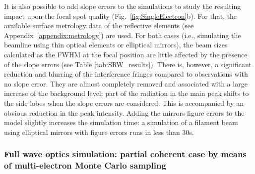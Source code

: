 \documentclass{iucr}              %
\begin{document}
It is also possible to add slope errors to the simulations to study the resulting impact upon the focal spot quality (Fig.~\ref{fig:SingleElectron}b). For that, the available surface metrology data of the reflective elements (see Appendix~\ref{appendix:metrology})  are used. For both cases (i.e., simulating the beamline using thin optical elements or elliptical mirrors), the beam sizes calculated as the FWHM at the focal position are little affected by the presence of the slope errors (see Table \ref{tab:SRW_results}). There is, however, a significant reduction and blurring of the interference fringes compared to observations with no slope error. They are almost completely removed and associated with a large increase of the background level: part of the radiation in the main peak shifts to the side lobes when the slope errors are considered. This is accompanied by an obvious reduction in the peak intensity.  Adding the mirrors figure errors to the model slightly increases the simulation time: a simulation of a filament beam using elliptical mirrors with figure errors runs in less than 30s. 

\begin{table}\label{tab:SRW_results}
\centering
\caption{Calculated beam dimensions (FWHM, in nm) at the focal position for different models of focusing elements using SRW.}
\end{table}


\subsubsection{Full wave optics simulation: partial coherent case by means of multi-electron Monte Carlo sampling}
\label{srw_me}
\end{document}

